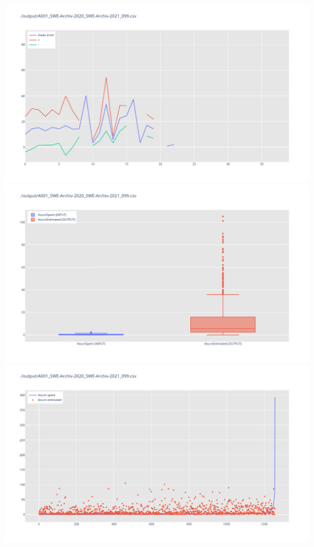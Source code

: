 \includegraphics[width=\textwidth]{Scripts/output/A001_SWE-Archiv-2020_SWE-Archiv-2021_099.csv.error_distribution.png}
\includegraphics[width=\textwidth]{Scripts/output/A001_SWE-Archiv-2020_SWE-Archiv-2021_099.csv.png}
\includegraphics[width=\textwidth]{Scripts/output/A001_SWE-Archiv-2020_SWE-Archiv-2021_099.csv.scatter.png}
